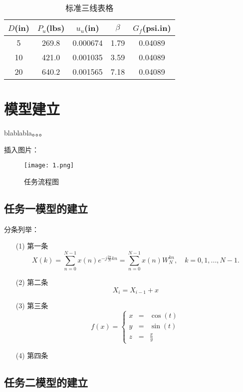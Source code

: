 \documentclass[withoutpreface,bwprint]{cumcmthesis} %
\begin{document}
\begin{table}[!htbp]
\caption{标准三线表格}\label{tab001} \centering
\begin{tabular}{ccccc}
\toprule[1.5pt]
$D$(in) & $P_u$(lbs) & $u_u$(in) & $\beta$ & $G_f$(psi.in)\\
\midrule[1pt]
 5 & 269.8 & 0.000674 & 1.79 & 0.04089\\
10 & 421.0 & 0.001035 & 3.59 & 0.04089\\
20 & 640.2 & 0.001565 & 7.18 & 0.04089\\
\bottomrule[1.5pt]
\end{tabular}
\end{table}

\section{模型建立}

blablabla。。。

插入图片：
\begin{figure}[!h]
\centering
\texttt{[image: 1.png]}
\caption{任务流程图}
\end{figure}
\subsection{任务一模型的建立}
分条列举：
\begin{itemize}
\item[(1)] 
第一条
\begin{equation}
X(k)=\sum_{n=0}^{N-1} x(n)e^{-j \frac{2 \pi}{N} k n}=\sum_{n=0}^{N-1} x(n) W_N^{kn},\quad k=0,1,...,N-1.
\end{equation}

\item[(2)]
第二条
\begin{equation}
X_i=X_{i-1}+x
\end{equation}
\item[(3)]
第三条
$$ f(x)=\left\{
\begin{aligned}
x & = & \cos(t) \\
y & = & \sin(t) \\
z & = & \frac xy
\end{aligned}
\right.
$$
\item[(4)]
第四条
\end{itemize}

\subsection{任务二模型的建立}
\end{document}
